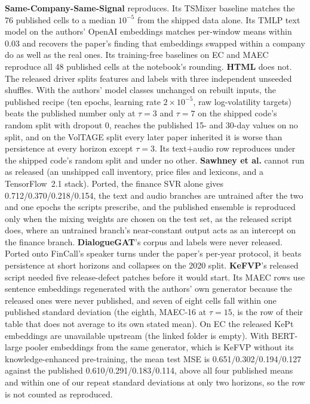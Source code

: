 \textbf{Same-Company-Same-Signal} reproduces. Its TSMixer baseline matches the 76
published cells to a median $10^{-5}$ from the shipped data alone. Its TMLP text
model on the authors' OpenAI embeddings matches per-window means within 0.03 and
recovers the paper's finding that embeddings swapped within a company do as well
as the real ones. Its training-free baselines on EC and MAEC reproduce all 48
published cells at the notebook's rounding. \textbf{HTML} does not. The released
driver splits features and labels with three independent unseeded shuffles. With
the authors' model classes unchanged on rebuilt inputs, the published recipe (ten
epochs, learning rate $2{\times}10^{-5}$, raw log-volatility targets) beats the
published number only at $\tau{=}3$ and $\tau{=}7$ on the shipped code's random
split with dropout 0, reaches the published 15- and 30-day values on no split, and
on the VolTAGE split every later paper inherited it is worse than persistence at
every horizon except $\tau{=}3$. Its text$+$audio row reproduces under the shipped
code's random split and under no other. \textbf{Sawhney et al.} cannot run as released (an unshipped call
inventory, price files and lexicons, and a TensorFlow~2.1 stack). Ported, the
finance SVR alone gives 0.712/0.370/0.218/0.154, the text and audio branches are
untrained after the two and one epochs the scripts prescribe, and the published
ensemble is reproduced only when the mixing weights are chosen on the test set, as
the released script does, where an untrained branch's near-constant output acts
as an intercept on the finance branch.
\textbf{DialogueGAT}'s corpus and labels were never released. Ported onto
FinCall's speaker turns under the paper's per-year protocol, it beats persistence
at short horizons and collapses on the 2020 split. \textbf{KeFVP}'s released
script needed five release-defect patches before it would start. Its MAEC rows use
sentence embeddings regenerated with the authors' own generator because the
released ones were never published, and seven of eight cells fall within one
published standard deviation (the eighth, MAEC-16 at $\tau{=}15$, is the row of
their table that does not average to its own stated mean). On EC the released
KePt embeddings are unavailable upstream (the linked folder is empty). With
BERT-large pooler embeddings from the same generator, which is KeFVP without its
knowledge-enhanced pre-training, the mean test MSE is 0.651/0.302/0.194/0.127
against the published 0.610/0.291/0.183/0.114, above all four published means and
within one of our repeat standard deviations at only two horizons, so the row is
not counted as reproduced.

